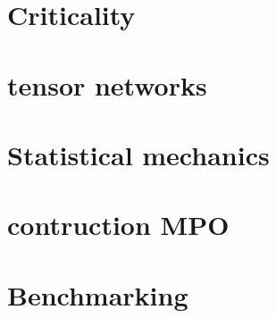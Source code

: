 \documentclass{article}
\begin{document}
\section{Criticality}


\section{tensor networks}


\section{Statistical mechanics}


\section{contruction MPO}




\section{Benchmarking}




\end{document}
